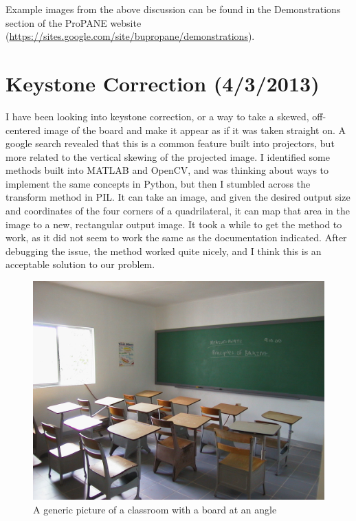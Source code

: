 \documentclass[]{article}
\begin{document}
Example images from the above discussion can be found in the Demonstrations section of the ProPANE website (\url{https://sites.google.com/site/bupropane/demonstrations}).
	\section{Keystone Correction (4/3/2013)}
		I have been looking into keystone correction, or a way to take a skewed, off-centered image of the board and make it appear as if it was taken straight on.  A google search revealed that this is a common feature built into projectors, but more related to the vertical skewing of the projected image.  I identified some methods built into MATLAB and OpenCV, and was thinking about ways to implement the same concepts in Python, but then I stumbled across the transform method in PIL.  It can take an image, and given the desired output size and coordinates of the four corners of a quadrilateral, it can map that area in the image to a new, rectangular output image.  It took a while to get the method to work, as it did not seem to work the same as the documentation indicated.  After debugging the issue, the method worked quite nicely, and I think this is an acceptable solution to our problem.  
	
\begin{figure}[H]
\centering
\includegraphics[scale=0.4]{images/classroom}
\caption{A generic picture of a classroom with a board at an angle}
\end{figure}	
\end{document}
